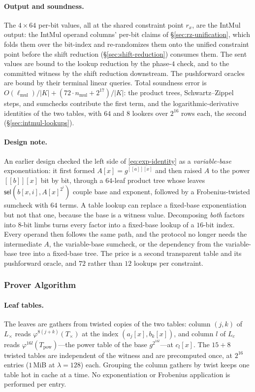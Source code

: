 \documentclass{article}
\theoremstyle{definition}
\newcommand{\intval}[1]{[\![#1]\!]}
\newcommand{\sel}{\textsf{sel}}
\begin{document}
\paragraph{Output and soundness.}
The $4 \times 64$ per-bit values, all at the shared constraint point $r_x$, are the IntMul output: the IntMul operand columns' per-bit claims of \S\ref{sec:rz-unification}, which folds them over the bit-index and re-randomizes them onto the unified constraint point before the shift reduction (\S\ref{sec:shift-reduction}) consumes them. The sent values are bound to the lookup reduction by the phase-$4$ check, and to the committed witness by the shift reduction downstream. The pushforward oracles are bound by their terminal linear queries. Total soundness error is $O(\ell_\text{mul}) / |K| + (72 \cdot n_\text{mul} + 2^{17}) / |K|$: the product trees, Schwartz--Zippel steps, and sumchecks contribute the first term, and the logarithmic-derivative identities of the two tables, with $64$ and $8$ lookers over $2^{16}$ rows each, the second (\S\ref{sec:intmul-lookups}).

\paragraph{Design note.}
An earlier design checked the left side of \eqref{eq:exp-identity} as a \emph{variable-base} exponentiation: it first formed $A[x] = g^{\intval{a}[x]}$ and then raised $A$ to the power $\intval{b}[x]$ bit by bit, through a $64$-leaf product tree whose leaves $\sel(b[x, i], A[x]^{2^i})$ couple base and exponent, followed by a Frobenius-twisted sumcheck with $64$ terms. A table lookup can replace a fixed-base exponentiation but not that one, because the base is a witness value. Decomposing \emph{both} factors into $8$-bit limbs turns every factor into a fixed-base lookup of a $16$-bit index. Every operand then follows the same path, and the protocol no longer needs the intermediate $A$, the variable-base sumcheck, or the dependency from the variable-base tree into a fixed-base tree. The price is a second transparent table and its pushforward oracle, and $72$ rather than $12$ lookups per constraint.

\subsubsection{Prover Algorithm}
\label{sec:intmul-prover}

\paragraph{Leaf tables.}
The leaves are gathers from twisted copies of the two tables: column $(j, k)$ of $L_\times$ reads $\varphi^{8(j + k)}(T_\times)$ at the index $(a_j[x], b_k[x])$, and column $l$ of $L_c$ reads $\varphi^{16 l}(T_\text{pow})$---the power table of the base $g^{2^{16 l}}$---at $c_l[x]$. The $15 + 8$ twisted tables are independent of the witness and are precomputed once, at $2^{16}$ entries ($1$\,MiB at $\lambda = 128$) each. Grouping the column gathers by twist keeps one table hot in cache at a time. No exponentiation or Frobenius application is performed per entry.
\end{document}
